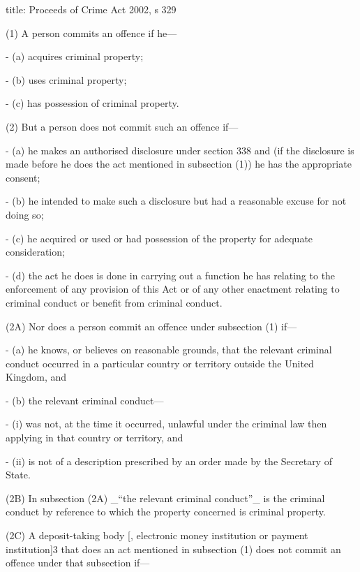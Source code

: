 \documentclass[
]{article}
\newenvironment{Shaded}{}{}
\newcommand{\NormalTok}[1]{#1}
\begin{document}
\begin{Shaded}
\begin{Highlighting}[]
\NormalTok{title: Proceeds of Crime Act 2002, s 329}

\NormalTok{(1) A person commits an offence if he—}

\NormalTok{{-} (a) acquires criminal property;}

\NormalTok{{-} (b) uses criminal property;}

\NormalTok{{-} (c) has possession of criminal property.}

\NormalTok{(2) But a person does not commit such an offence if—}

\NormalTok{{-} (a) he makes an authorised disclosure under section 338 and (if the disclosure is made before he does the act mentioned in subsection (1)) he has the appropriate consent;}

\NormalTok{{-} (b) he intended to make such a disclosure but had a reasonable excuse for not doing so;}

\NormalTok{{-} (c) he acquired or used or had possession of the property for adequate consideration;}

\NormalTok{{-} (d) the act he does is done in carrying out a function he has relating to the enforcement of any provision of this Act or of any other enactment relating to criminal conduct or benefit from criminal conduct.}

\NormalTok{(2A) Nor does a person commit an offence under subsection (1) if—}

\NormalTok{{-} (a) he knows, or believes on reasonable grounds, that the relevant criminal conduct occurred in a particular country or territory outside the United Kingdom, and}

\NormalTok{{-} (b) the relevant criminal conduct—}

\NormalTok{    {-} (i) was not, at the time it occurred, unlawful under the criminal law then applying in that country or territory, and}
    
\NormalTok{    {-} (ii) is not of a description prescribed by an order made by the Secretary of State.}

\NormalTok{(2B) In subsection (2A) \_“the relevant criminal conduct”\_ is the criminal conduct by reference to which the property concerned is criminal property.}

\NormalTok{(2C) A deposit{-}taking body [, electronic money institution or payment institution]3 that does an act mentioned in subsection (1) does not commit an offence under that subsection if—}


\end{Highlighting}
\end{Shaded}
\end{document}

